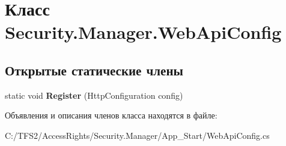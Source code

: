 \hypertarget{class_security_1_1_manager_1_1_web_api_config}{}\section{Класс Security.\+Manager.\+Web\+Api\+Config}
\label{class_security_1_1_manager_1_1_web_api_config}
\subsection*{Открытые статические члены}
\begin{DoxyCompactItemize}
\item 
\mbox{\label{class_security_1_1_manager_1_1_web_api_config_ad3b6bdbd0a26ae46bfc36a4bb9b7acc3}} 
static void {\bfseries Register} (Http\+Configuration config)
\end{DoxyCompactItemize}


Объявления и описания членов класса находятся в файле\+:\begin{DoxyCompactItemize}
\item 
C\+:/\+T\+F\+S2/\+Access\+Rights/\+Security.\+Manager/\+App\+\_\+\+Start/Web\+Api\+Config.\+cs\end{DoxyCompactItemize}
